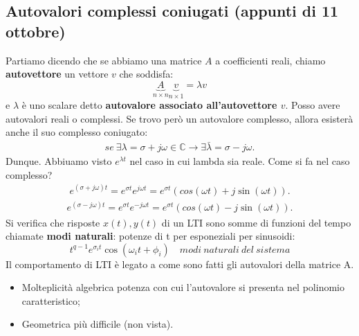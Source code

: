 \documentclass[a4paper]{report}
\begin{document}
\subsection{Autovalori complessi coniugati (appunti di 11 ottobre)}
Partiamo dicendo che se abbiamo una matrice $A$ a coefficienti reali, chiamo \textbf{autovettore} un vettore $v$ che soddisfa:
\begin{equation*}
	\underbrace{A}_{n\times n}\underbrace{v}_{n\times 1} = \lambda v
\end{equation*}
e $\lambda$ è uno scalare detto \textbf{autovalore associato all'autovettore $v$}. 
Posso avere autovalori reali o complessi. Se trovo però un autovalore complesso, allora esisterà anche il suo complesso coniugato:
\begin{align*}
	se \ \exists \lambda = \sigma + j \omega \in \mathbb{C} \rightarrow \exists \bar \lambda = \sigma - j \omega.
\end{align*}
Dunque. Abbiuamo visto $e^{\lambda t}$ nel caso in cui lambda sia reale. Come si fa nel caso complesso?
\begin{align*}
	e^{(\sigma + j\omega)t} = e^{\sigma t}e^{j\omega t} = e^{\sigma t}(cos (\omega t) + j \sin (\omega t)).
\end{align*}
\begin{align*}
	e^{(\sigma - j\omega)t} = e^{\sigma t}e^{-j\omega t} = e^{\sigma t}(cos (\omega t) - j \sin (\omega t)).
\end{align*}
Si verifica che risposte $x(t), y(t)$ di un LTI sono somme di funzioni del tempo chiamate \textbf{modi naturali}: potenze di t per esponeziali per sinusoidi:
\begin{equation*}
	t^{q-1} e^{\sigma _i t} \cos(\omega _i t + \phi_i) \quad modi \ naturali \ del \ sistema
\end{equation*}
Il comportamento di LTI è legato a come sono fatti gli autovalori della matrice A.
\bb
\begin{itemize}
	\item Molteplicità algebrica \rarr potenza con cui l'autovalore si presenta nel polinomio caratteristico;
	\item Geometrica \rarr più difficile (non vista).
\end{itemize}
\end{document}
